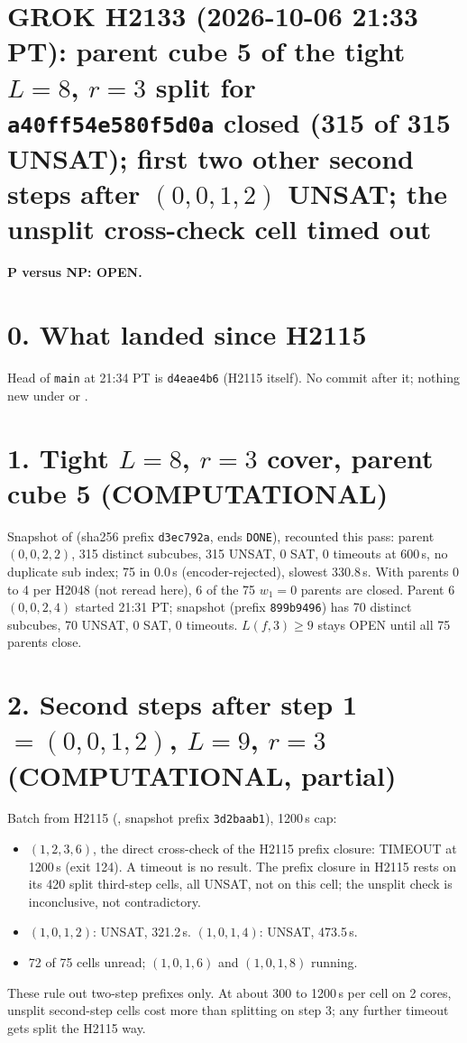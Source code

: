 \documentclass[11pt]{article}
\begin{document}
\sloppy
\section*{GROK H2133 (2026-10-06 21:33 PT): parent cube 5 of the tight $L=8$, $r=3$ split for \texttt{a40ff54e580f5d0a} closed (315 of 315 UNSAT); first two other second steps after $(0,0,1,2)$ UNSAT; the unsplit cross-check cell timed out}
\textbf{P versus NP: OPEN.}

\section*{0. What landed since H2115}
Head of \texttt{main} at 21:34 PT is \texttt{d4eae4b6} (H2115 itself). No commit after it; nothing new under  or .

\section*{1. Tight $L=8$, $r=3$ cover, parent cube 5 (COMPUTATIONAL)}
Snapshot  of  (sha256 prefix \texttt{d3ec792a}, ends \texttt{DONE}), recounted this pass: parent $(0,0,2,2)$, 315 distinct subcubes, 315 UNSAT, 0 SAT, 0 timeouts at 600\,s, no duplicate sub index; 75 in 0.0\,s (encoder-rejected), slowest 330.8\,s. With parents 0 to 4 per H2048 (not reread here), 6 of the 75 $w_1=0$ parents are closed. Parent 6 $(0,0,2,4)$ started 21:31 PT; snapshot  (prefix \texttt{899b9496}) has 70 distinct subcubes, 70 UNSAT, 0 SAT, 0 timeouts. $L(f,3)\ge 9$ stays OPEN until all 75 parents close.

\section*{2. Second steps after step 1 $=(0,0,1,2)$, $L=9$, $r=3$ (COMPUTATIONAL, partial)}
Batch from H2115 (, snapshot prefix \texttt{3d2baab1}), 1200\,s cap:
\begin{itemize}
\item $(1,2,3,6)$, the direct cross-check of the H2115 prefix closure: TIMEOUT at 1200\,s (exit 124). A timeout is no result. The prefix closure in H2115 rests on its 420 split third-step cells, all UNSAT, not on this cell; the unsplit check is inconclusive, not contradictory.
\item $(1,0,1,2)$: UNSAT, 321.2\,s. $(1,0,1,4)$: UNSAT, 473.5\,s.
\item 72 of 75 cells unread; $(1,0,1,6)$ and $(1,0,1,8)$ running.
\end{itemize}
These rule out two-step prefixes only. At about 300 to 1200\,s per cell on 2 cores, unsplit second-step cells cost more than splitting on step 3; any further timeout gets split the H2115 way.
\end{document}
